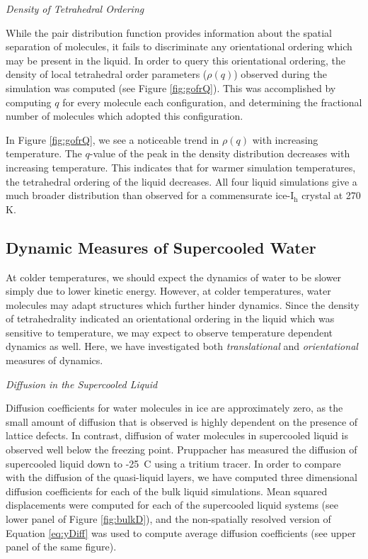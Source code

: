 \begin{flushleft}
\textit{Density of Tetrahedral Ordering}
\end{flushleft}

While the pair distribution function provides information about
the spatial separation of molecules, it fails to discriminate any
orientational ordering which may be present in the liquid. In order to
query this orientational ordering, the density of local tetrahedral
order parameters ($\rho (q)$) observed during the simulation was
computed (see Figure \ref{fig:gofrQ}). This was accomplished by
computing $q$ for every molecule each configuration, and determining
the fractional number of molecules which adopted this configuration.

In Figure \ref{fig:gofrQ}, we see a noticeable trend in $\rho (q)$
with increasing temperature. The $q$-value of the peak in the density
distribution decreases with increasing temperature. This indicates
that for warmer simulation temperatures, the tetrahedral ordering of
the liquid decreases. All four liquid simulations give a much broader
distribution than observed for a commensurate ice-I$_\mathrm{h}$
crystal at 270 K.





\subsection{Dynamic Measures of Supercooled Water}
At colder temperatures, we should expect the dynamics of water to be
slower simply due to lower kinetic energy. However, at colder
temperatures, water molecules may adapt structures which further hinder
dynamics. Since the density of tetrahedrality indicated an
orientational ordering in the liquid which was sensitive to
temperature, we may expect to observe temperature dependent dynamics
as well. Here, we have investigated both \textit{translational} and
\textit{orientational} measures of dynamics.

\begin{flushleft}
\textit{Diffusion in the Supercooled Liquid}
\end{flushleft}

Diffusion coefficients for water molecules in ice are approximately
zero, as the small amount of diffusion that is observed is highly
dependent on the presence of lattice defects. In contrast, diffusion
of water molecules in supercooled liquid is observed well below the
freezing point.\cite{Debenedetti2003} Pruppacher has measured the
diffusion of supercooled liquid down to -25\degree~C using a tritium
tracer.\cite{Pruppacher1972} In order to compare with the diffusion of
the quasi-liquid layers, we have computed three dimensional diffusion
coefficients for each of the bulk liquid simulations. Mean squared
displacements were computed for each of the supercooled liquid systems
(see lower panel of Figure \ref{fig:bulkD}), and the non-spatially
resolved version of Equation \eqref{eq:yDiff} was used to compute
average diffusion coefficients (see upper panel of the same figure).

